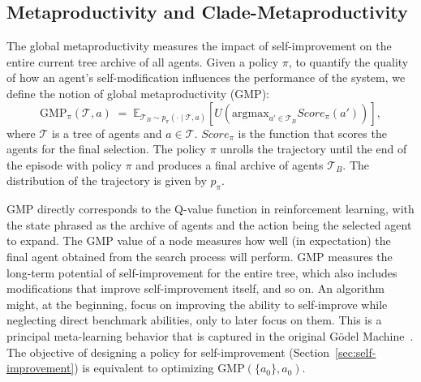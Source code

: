 \documentclass{article}
\begin{document}
\subsection{Metaproductivity and Clade-Metaproductivity}\label{sec:CMP}

The global metaproductivity measures the impact of self-improvement on the entire current tree archive of all agents. 
Given a policy $\pi$, to quantify the quality of how an agent's self-modification influences the performance of the system, we define the notion of global metaproductivity ($\mathrm{GMP}$):
\[
\mathrm{GMP}_\pi(\mathcal{T},a) \;=\; 
\mathbb{E}_{\mathcal{T}_B \sim p_\pi(\cdot \mid \mathcal{T},a)}
\left[   U(\text{argmax}_{a' \in \mathcal{T}_B}Score_\pi(a')) \right],
\]
where $\mathcal{T}$ is a tree of agents and $a\in\mathcal{T}$. $Score_\pi$ is the function that scores the agents for the final selection. The policy $\pi$ unrolls the trajectory until the end of the episode with policy $\pi$ and produces a final archive of agents $\mathcal{T}_B$. The distribution of the trajectory is given by $p_\pi$.

$\mathrm{GMP}$ directly corresponds to the Q-value function in reinforcement learning, with the state phrased as the archive of agents and the action being the selected agent to expand. The $\mathrm{GMP}$ value of a node measures how well (in expectation) the final agent obtained from the search process will perform. $\mathrm{GMP}$ measures the long-term potential of self-improvement for the entire tree, which also includes modifications that improve self-improvement itself, and so on. 
An algorithm might, at the beginning, focus on improving the ability to self-improve while neglecting direct benchmark abilities, only to later focus on them. 
This is a principal meta-learning behavior that is captured in the original G\"odel Machine~\citep{Schmidhuber:03gm}. The objective of designing a policy for self-improvement (Section~\ref{sec:self-improvement}) is equivalent to optimizing $\mathrm{GMP}(\{a_0\}, a_0)$.
\end{document}
